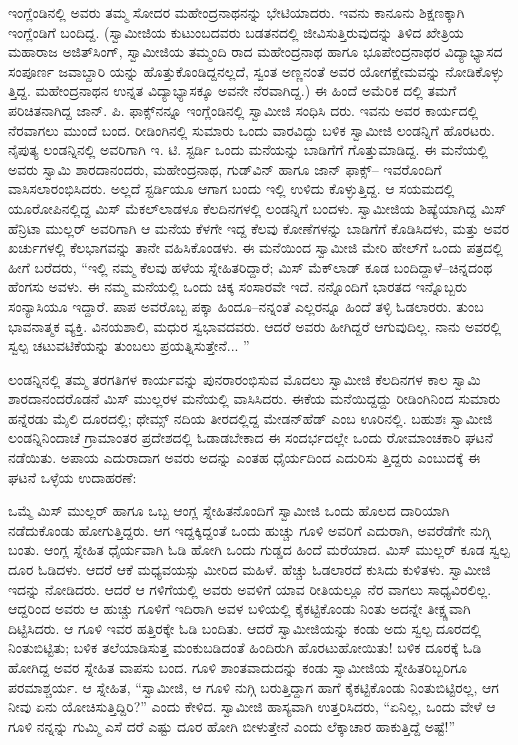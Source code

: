 ಇಂಗ್ಲೆಂಡಿನಲ್ಲಿ ಅವರು ತಮ್ಮ ಸೋದರ ಮಹೇಂದ್ರನಾಥನನ್ನು ಭೇಟಿಯಾದರು. ಇವನು ಕಾನೂನು ಶಿಕ್ಷಣಕ್ಕಾಗಿ ಇಂಗ್ಲೆಂಡಿಗೆ ಬಂದಿದ್ದ. (ಸ್ವಾಮೀಜಿಯ ಕುಟುಂಬದವರು ಬಡತನದಲ್ಲಿ ಜೀವಿಸುತ್ತಿರುವುದನ್ನು ತಿಳಿದ ಖೇತ್ರಿಯ ಮಹಾರಾಜ ಅಜಿತ್​ಸಿಂಗ್, ಸ್ವಾಮೀಜಿಯ ತಮ್ಮಂದಿ ರಾದ ಮಹೇಂದ್ರನಾಥ ಹಾಗೂ ಭೂಪೇಂದ್ರನಾಥರ ವಿದ್ಯಾಭ್ಯಾಸದ ಸಂಪೂರ್ಣ ಜವಾಬ್ದಾರಿ ಯನ್ನು ಹೊತ್ತುಕೊಂಡಿದ್ದನಲ್ಲದೆ, ಸ್ವಂತ ಅಣ್ಣನಂತೆ ಅವರ ಯೋಗಕ್ಷೇಮವನ್ನು ನೋಡಿಕೊಳ್ಳು ತ್ತಿದ್ದ. ಮಹೇಂದ್ರನಾಥನ ಉನ್ನತ ವಿದ್ಯಾಭ್ಯಾಸಕ್ಕೂ ಅವನೇ ನೆರವಾಗಿದ್ದ.) ಈ ಹಿಂದೆ ಅಮೆರಿಕ ದಲ್ಲಿ ತಮಗೆ ಪರಿಚಿತನಾಗಿದ್ದ ಜಾನ್. ಪಿ. ಫಾಕ್ಸ್​ನನ್ನೂ ಇಂಗ್ಲೆಂಡಿನಲ್ಲಿ ಸ್ವಾಮೀಜಿ ಸಂಧಿಸಿ ದರು. ಇವನು ಅವರ ಕಾರ್ಯದಲ್ಲಿ ನೆರವಾಗಲು ಮುಂದೆ ಬಂದ. ರೀಡಿಂಗಿನಲ್ಲಿ ಸುಮಾರು ಒಂದು ವಾರವಿದ್ದು ಬಳಿಕ ಸ್ವಾಮೀಜಿ ಲಂಡನ್ನಿಗೆ ಹೊರಟರು. ನೈಪುತ್ಯ ಲಂಡನ್ನಿನಲ್ಲಿ ಅವರಿಗಾಗಿ ಇ. ಟಿ. ಸ್ಟರ್ಡಿ ಒಂದು ಮನೆಯನ್ನು ಬಾಡಿಗೆಗೆ ಗೊತ್ತುಮಾಡಿದ್ದ. ಈ ಮನೆಯಲ್ಲಿ ಅವರು ಸ್ವಾಮಿ ಶಾರದಾನಂದರು, ಮಹೇಂದ್ರನಾಥ, ಗುಡ್​ವಿನ್ ಹಾಗೂ ಜಾನ್ ಫಾಕ್ಸ್​– ಇವರೊಂದಿಗೆ ವಾಸಿಸಲಾರಂಭಿಸಿದರು. ಅಲ್ಲದೆ ಸ್ಟರ್ಡಿಯೂ ಆಗಾಗ ಬಂದು ಇಲ್ಲಿ ಉಳಿದು ಕೊಳ್ಳುತ್ತಿದ್ದ. ಆ ಸಯಮದಲ್ಲಿ ಯೂರೋಪಿನಲ್ಲಿದ್ದ ಮಿಸ್ ಮೆಕಲ್​ಲಾಡಳೂ ಕೆಲದಿನಗಳಲ್ಲಿ ಲಂಡನ್ನಿಗೆ ಬಂದಳು. ಸ್ವಾಮೀಜಿಯ ಶಿಷ್ಯೆಯಾಗಿದ್ದ ಮಿಸ್ ಹೆನ್ರಿಟಾ ಮುಲ್ಲರ್ ಅವರಿಗಾಗಿ ಆ ಮನೆಯ ಕೆಳಗೇ ಇದ್ದ ಕೆಲವು ಕೋಣೆಗಳನ್ನು ಬಾಡಿಗೆಗೆ ಕೊಡಿಸಿದಳು, ಮತ್ತು ಅವರ ಖರ್ಚುಗಳಲ್ಲಿ ಕೆಲಭಾಗವನ್ನು ತಾನೇ ವಹಿಸಿಕೊಂಡಳು. ಈ ಮನೆಯಿಂದ ಸ್ವಾಮೀಜಿ ಮೇರಿ ಹೇಲ್​ಗೆ ಒಂದು ಪತ್ರದಲ್ಲಿ ಹೀಗೆ ಬರೆದರು, “ಇಲ್ಲಿ ನಮ್ಮ ಕೆಲವು ಹಳೆಯ ಸ್ನೇಹಿತರಿದ್ದಾರೆ; ಮಿಸ್ ಮೆಕ್​ಲಾಡ್ ಕೂಡ ಬಂದಿದ್ದಾಳೆ–ಚಿನ್ನದಂಥ ಹೆಂಗಸು ಅವಳು. ಈ ನಮ್ಮ ಮನೆಯಲ್ಲಿ ಒಂದು ಚಿಕ್ಕ ಸಂಸಾರವೇ ಇದೆ. ನನ್ನೊಂದಿಗೆ ಭಾರತದ ಇನ್ನೊಬ್ಬರು ಸಂನ್ಯಾಸಿಯೂ ಇದ್ದಾರೆ. ಪಾಪ ಅವರೊಬ್ಬ ಪಕ್ಕಾ ಹಿಂದೂ–ನನ್ನಂತೆ ಎಲ್ಲರನ್ನೂ ಹಿಂದೆ ತಳ್ಳಿ ಓಡಲಾರರು. ತುಂಬ ಭಾವನಾತ್ಮಕ ವ್ಯಕ್ತಿ. ವಿನಯಶಾಲಿ, ಮಧುರ ಸ್ವಭಾವದವರು. ಆದರೆ ಅವರು ಹೀಗಿದ್ದರೆ ಆಗುವುದಿಲ್ಲ. ನಾನು ಅವರಲ್ಲಿ ಸ್ವಲ್ಪ ಚಟುವಟಿಕೆಯನ್ನು ತುಂಬಲು ಪ್ರಯತ್ನಿಸುತ್ತೇನೆ... ”

ಲಂಡನ್ನಿನಲ್ಲಿ ತಮ್ಮ ತರಗತಿಗಳ ಕಾರ್ಯವನ್ನು ಪುನರಾರಂಭಿಸುವ ಮೊದಲು ಸ್ವಾಮೀಜಿ ಕೆಲದಿನಗಳ ಕಾಲ ಸ್ವಾಮಿ ಶಾರದಾನಂದರೊಡನೆ ಮಿಸ್ ಮುಲ್ಲರಳ ಮನೆಯಲ್ಲಿ ವಾಸಿಸಿದರು. ಈಕೆಯ ಮನೆಯಿದ್ದದ್ದು ರೀಡಿಂಗಿನಿಂದ ಸುಮಾರು ಹನ್ನೆರಡು ಮೈಲಿ ದೂರದಲ್ಲಿ; ಥೇಮ್ಸ್ ನದಿಯ ತೀರದಲ್ಲಿದ್ದ ಮೇಡನ್​ಹೆಡ್ ಎಂಬ ಊರಿನಲ್ಲಿ. ಬಹುಶಃ ಸ್ವಾಮೀಜಿ ಲಂಡನ್ನಿನಿಂದಾಚೆ ಗ್ರಾಮಾಂತರ ಪ್ರದೇಶದಲ್ಲಿ ಓಡಾಡಬೇಕಾದ ಈ ಸಂದರ್ಭದಲ್ಲೇ ಒಂದು ರೋಮಾಂಚಕಾರಿ ಘಟನೆ ನಡೆಯಿತು. ಅಪಾಯ ಎದುರಾದಾಗ ಅವರು ಅದನ್ನು ಎಂತಹ ಧೈರ್ಯದಿಂದ ಎದುರಿಸು ತ್ತಿದ್ದರು ಎಂಬುದಕ್ಕೆ ಈ ಘಟನೆ ಒಳ್ಳೆಯ ಉದಾಹರಣೆ:

ಒಮ್ಮೆ ಮಿಸ್ ಮುಲ್ಲರ್ ಹಾಗೂ ಒಬ್ಬ ಆಂಗ್ಲ ಸ್ನೇಹಿತನೊಂದಿಗೆ ಸ್ವಾಮೀಜಿ ಒಂದು ಹೊಲದ ದಾರಿಯಾಗಿ ನಡೆದುಕೊಂಡು ಹೋಗುತ್ತಿದ್ದರು. ಆಗ ಇದ್ದಕ್ಕಿದ್ದಂತೆ ಒಂದು ಹುಚ್ಚು ಗೂಳಿ ಅವರಿಗೆ ಎದುರಾಗಿ, ಅವರೆಡೆಗೇ ನುಗ್ಗಿ ಬಂತು. ಆಂಗ್ಲ ಸ್ನೇಹಿತ ಧೈರ್ಯವಾಗಿ ಓಡಿ ಹೋಗಿ ಒಂದು ಗುಡ್ಡದ ಹಿಂದೆ ಮರೆಯಾದ. ಮಿಸ್ ಮುಲ್ಲರ್ ಕೂಡ ಸ್ವಲ್ಪ ದೂರ ಓಡಿದಳು. ಆದರೆ ಆಕೆ ಮಧ್ಯವಯಸ್ಸು ಮೀರಿದ ಮಹಿಳೆ. ಹೆಚ್ಚು ಓಡಲಾರದೆ ಕುಸಿದು ಕುಳಿತಳು. ಸ್ವಾಮೀಜಿ ಇದನ್ನು ನೋಡಿದರು. ಆದರೆ ಆ ಗಳಿಗೆಯಲ್ಲಿ ಅವರು ಅವಳಿಗೆ ಯಾವ ರೀತಿಯಲ್ಲೂ ನೆರ ವಾಗಲು ಸಾಧ್ಯವಿರಲಿಲ್ಲ. ಆದ್ದರಿಂದ ಅವರು ಆ ಹುಚ್ಚು ಗೂಳಿಗೆ ಇದಿರಾಗಿ ಅವಳ ಬಳಿಯಲ್ಲಿ ಕೈಕಟ್ಟಿಕೊಂಡು ನಿಂತು ಅದನ್ನೇ ತೀಕ್ಷ್ಣವಾಗಿ ದಿಟ್ಟಿಸಿದರು. ಆ ಗೂಳಿ ಇವರ ಹತ್ತಿರಕ್ಕೇ ಓಡಿ ಬಂದಿತು. ಆದರೆ ಸ್ವಾಮೀಜಿಯನ್ನು ಕಂಡು ಅದು ಸ್ವಲ್ಪ ದೂರದಲ್ಲಿ ನಿಂತುಬಿಟ್ಟಿತು; ಬಳಿಕ ತಲೆಯಾಡಿಸುತ್ತ ಮಂಕುಬಡಿದಂತೆ ಹಿಂದಿರುಗಿ ಹೊರಟುಹೋಯಿತು! ಬಳಿಕ ದೂರಕ್ಕೆ ಓಡಿ ಹೋಗಿದ್ದ ಅವರ ಸ್ನೇಹಿತ ವಾಪಸು ಬಂದ. ಗೂಳಿ ಶಾಂತವಾದುದನ್ನು ಕಂಡು ಸ್ವಾಮೀಜಿಯ ಸ್ನೇಹಿತರಿಬ್ಬರಿಗೂ ಪರಮಾಶ್ಚರ್ಯ. ಆ ಸ್ನೇಹಿತ, “ಸ್ವಾಮೀಜಿ, ಆ ಗೂಳಿ ನುಗ್ಗಿ ಬರುತ್ತಿದ್ದಾಗ ಹಾಗೆ ಕೈಕಟ್ಟಿಕೊಂಡು ನಿಂತುಬಿಟ್ಟಿರಲ್ಲ, ಆಗ ನೀವು ಏನು ಯೋಚಿಸುತ್ತಿದ್ದಿರಿ?” ಎಂದು ಕೇಳಿದ. ಸ್ವಾಮೀಜಿ ಹಾಸ್ಯವಾಗಿ ಉತ್ತರಿಸಿದರು, “ಏನಿಲ್ಲ, ಒಂದು ವೇಳೆ ಆ ಗೂಳಿ ನನ್ನನ್ನು ಗುಮ್ಮಿ ಎಸೆ ದರೆ ಎಷ್ಟು ದೂರ ಹೋಗಿ ಬೀಳುತ್ತೇನೆ ಎಂದು ಲೆಕ್ಕಾಚಾರ ಹಾಕುತ್ತಿದ್ದೆ ಅಷ್ಟೆ!”

